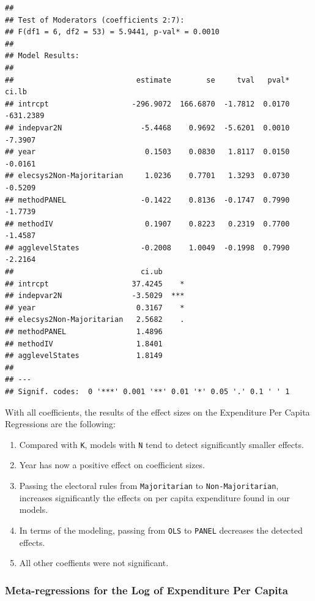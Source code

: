 \documentclass[
]{article}
\providecommand{\tightlist}{%
  \setlength{\itemsep}{0pt}\setlength{\parskip}{0pt}}
\begin{document}
\begin{verbatim}
## 
## Test of Moderators (coefficients 2:7):
## F(df1 = 6, df2 = 53) = 5.9441, p-val* = 0.0010
## 
## Model Results:
## 
##                            estimate        se     tval   pval*      ci.lb 
## intrcpt                   -296.9072  166.6870  -1.7812  0.0170  -631.2389 
## indepvar2N                  -5.4468    0.9692  -5.6201  0.0010    -7.3907 
## year                         0.1503    0.0830   1.8117  0.0150    -0.0161 
## elecsys2Non-Majoritarian     1.0236    0.7701   1.3293  0.0730    -0.5209 
## methodPANEL                 -0.1422    0.8136  -0.1747  0.7990    -1.7739 
## methodIV                     0.1907    0.8223   0.2319  0.7700    -1.4587 
## agglevelStates              -0.2008    1.0049  -0.1998  0.7990    -2.2164 
##                             ci.ub 
## intrcpt                   37.4245    * 
## indepvar2N                -3.5029  *** 
## year                       0.3167    * 
## elecsys2Non-Majoritarian   2.5682    . 
## methodPANEL                1.4896      
## methodIV                   1.8401      
## agglevelStates             1.8149      
## 
## ---
## Signif. codes:  0 '***' 0.001 '**' 0.01 '*' 0.05 '.' 0.1 ' ' 1
\end{verbatim}

With all coefficients, the results of the effect sizes on the
Expenditure Per Capita Regressions are the following:

\begin{enumerate}
\def\labelenumi{\arabic{enumi}.}
\tightlist
\item
  Compared with \texttt{K}, models with \texttt{N} tend to detect
  significantly smaller effects.
\item
  Year has now a positive effect on coefficient sizes.
\item
  Passing the electoral rules from \texttt{Majoritarian} to
  \texttt{Non-Majoritarian}, increases significantly the effects on per
  capita expenditure found in our models.
\item
  In terms of the modeling, passing from \texttt{OLS} to \texttt{PANEL}
  decreases the detected effects.
\item
  All other coeffients were not significant.
\end{enumerate}

\hypertarget{meta-regressions-for-the-log-of-expenditure-per-capita}{%
\subsubsection{Meta-regressions for the Log of Expenditure Per
Capita}\label{meta-regressions-for-the-log-of-expenditure-per-capita}}
\end{document}
